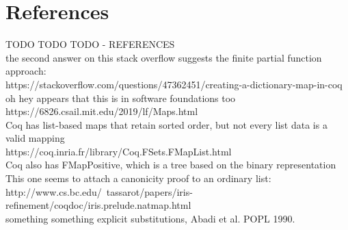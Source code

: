 \documentclass[nonacm]{acmart}
\theoremstyle{slplain}
\numberwithin{thm}{section}
\begin{document}

\section{References}
\label{sec:References}
TODO TODO TODO - REFERENCES
\\
the second answer on this stack overflow suggests the finite partial function approach:
\\
https://stackoverflow.com/questions/47362451/creating-a-dictionary-map-in-coq
\\
oh hey appears that this is in software foundations too
\\
https://6826.csail.mit.edu/2019/lf/Maps.html
\\
Coq has list-based maps that retain sorted order, but not every list data is a valid mapping
\\
https://coq.inria.fr/library/Coq.FSets.FMapList.html
\\
Coq also has FMapPositive, which is a tree based on the binary representation
\\
This one seems to attach a canonicity proof to an ordinary list:
\\
http://www.cs.bc.edu/~tassarot/papers/iris-refinement/coqdoc/iris.prelude.natmap.html
\\
something something explicit substitutions, Abadi et al. POPL 1990.

\clearpage
%


% 
\end{document}
